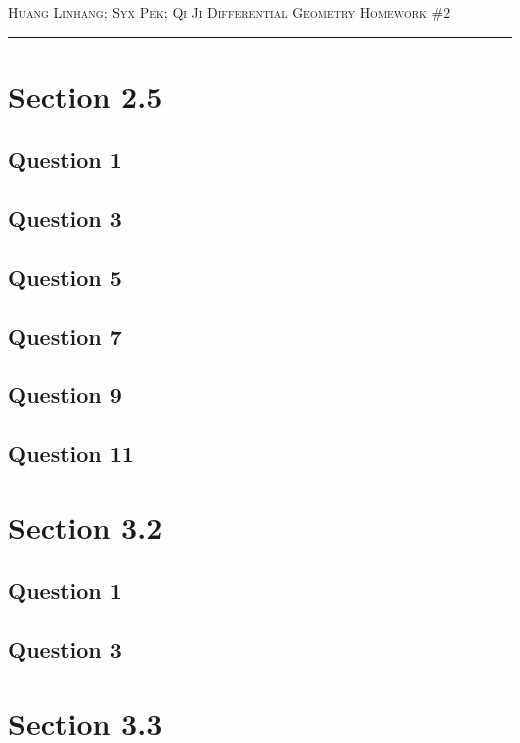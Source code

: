 \documentclass[12pt]{article}
\begin{document}
\thispagestyle{empty}

{\scshape Huang Linhang; Syx Pek; Qi Ji} \hfill {\scshape \large Differential Geometry} \hfill {\scshape Homework \#2}
 
\smallskip
\hrule
\bigskip
\section{Section 2.5}
\subsection*{Question 1}

\subsection*{Question 3}

\subsection*{Question 5}

\subsection*{Question 7}

\subsection*{Question 9}

\subsection*{Question 11}

\section{Section 3.2}
\subsection*{Question 1}

\subsection*{Question 3}

\section{Section 3.3}
\end{document}
